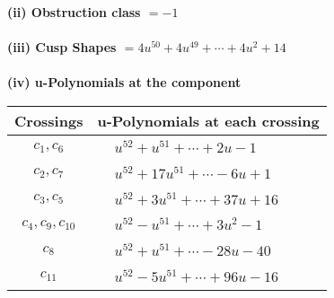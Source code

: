 \documentclass[1p]{elsarticle_modified}
\theoremstyle{definition}
\begin{document}
\flushleft \textbf{(ii) Obstruction class $= -1$}\\~\\
\flushleft \textbf{(iii) Cusp Shapes $= 4 u^{50}+4 u^{49}+\cdots+4 u^2+14$}\\~\\
\newpage\renewcommand{\arraystretch}{1}
\flushleft \textbf{(iv) u-Polynomials at the component}\newline \\
\begin{tabular}{m{50pt}|m{274pt}}
Crossings & \hspace{64pt}u-Polynomials at each crossing \\
\hline $$\begin{aligned}c_{1},c_{6}\end{aligned}$$&$\begin{aligned}
&u^{52}+u^{51}+\cdots+2 u-1
\end{aligned}$\\
\hline $$\begin{aligned}c_{2},c_{7}\end{aligned}$$&$\begin{aligned}
&u^{52}+17 u^{51}+\cdots-6 u+1
\end{aligned}$\\
\hline $$\begin{aligned}c_{3},c_{5}\end{aligned}$$&$\begin{aligned}
&u^{52}+3 u^{51}+\cdots+37 u+16
\end{aligned}$\\
\hline $$\begin{aligned}c_{4},c_{9},c_{10}\end{aligned}$$&$\begin{aligned}
&u^{52}- u^{51}+\cdots+3 u^2-1
\end{aligned}$\\
\hline $$\begin{aligned}c_{8}\end{aligned}$$&$\begin{aligned}
&u^{52}+u^{51}+\cdots-28 u-40
\end{aligned}$\\
\hline $$\begin{aligned}c_{11}\end{aligned}$$&$\begin{aligned}
&u^{52}-5 u^{51}+\cdots+96 u-16
\end{aligned}$\\
\hline
\end{tabular}\\~\\
\end{document}
